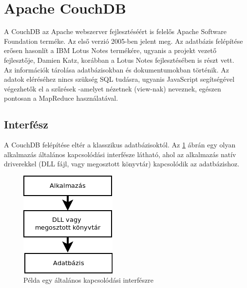 \section{Apache CouchDB}
\label{sec:couchdb}
	A CouchDB az Apache webszerver fejlesztéséért is felelős Apache Software Foundation terméke. Az első verzió 2005-ben jelent meg. Az adatbázis felépítése erősen hasonlít a IBM Lotus Notes termékére, ugyanis a projekt vezető fejlesztője, Damien Katz, korábban a Lotus Notes fejlesztésében is részt vett.\\
	 Az információk tárolása adatbázisokban és dokumentumokban történik. Az adatok eléréséhez nincs szükség SQL tudásra, ugyanis JavaScript segítségével végezhetők el a szűrések -amelyet nézetnek (view-nak) neveznek, egészen pontosan a MapReduce használatával.
	\subsection{Interfész}
		A CouchDB felépítése eltér a klasszikus adatbázisoktól. Az \ref{fig:conn_int_standard} ábrán egy olyan alkalmazás általános kapcsolódási interfésze látható, ahol az alkalmazás natív driverekkel (DLL fájl, vagy megosztott könyvtár) kapcsolódik az adatbázishoz.
		\begin{figure}[h]
			\centering
				\includegraphics[scale=0.7]{pictures/conn_int_standard.png}%
				\caption{Példa egy általános kapcsolódási interfészre}
				\label{fig:conn_int_standard}
		\end{figure}
		
